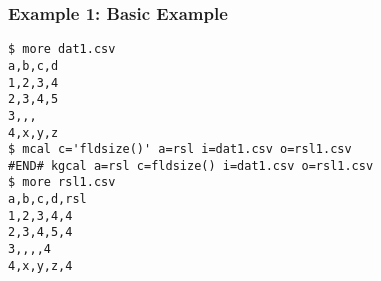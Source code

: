 \subsubsection*{Example 1: Basic Example}



\begin{Verbatim}[baselinestretch=0.7,frame=single]
$ more dat1.csv
a,b,c,d
1,2,3,4
2,3,4,5
3,,,
4,x,y,z
$ mcal c='fldsize()' a=rsl i=dat1.csv o=rsl1.csv
#END# kgcal a=rsl c=fldsize() i=dat1.csv o=rsl1.csv
$ more rsl1.csv
a,b,c,d,rsl
1,2,3,4,4
2,3,4,5,4
3,,,,4
4,x,y,z,4
\end{Verbatim}
